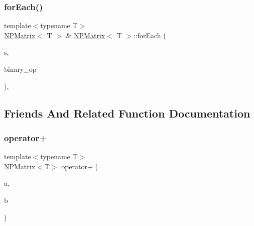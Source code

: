 \subsubsection{\texorpdfstring{forEach()}{forEach()}\hspace{0.1cm}{\footnotesize\ttfamily [2/2]}}
{\footnotesize\ttfamily template$<$typename T$>$ \\
\mbox{\hyperlink{class_n_p_matrix}{N\+P\+Matrix}}$<$ T $>$ \& \mbox{\hyperlink{class_n_p_matrix}{N\+P\+Matrix}}$<$ T $>$\+::for\+Each (\begin{DoxyParamCaption}\item[{T}]{s,  }\item[{const function$<$ void(T \&, T)$>$ \&}]{binary\+\_\+op }\end{DoxyParamCaption})\hspace{0.3cm}{\ttfamily [override]}, {\ttfamily [protected]}}



\subsection{Friends And Related Function Documentation}
\mbox{\label{class_n_p_matrix_aa3388754bcd5226d11ca97c258864300}} 
\subsubsection{\texorpdfstring{operator+}{operator+}}
{\footnotesize\ttfamily template$<$typename T$>$ \\
\mbox{\hyperlink{class_n_p_matrix}{N\+P\+Matrix}}$<$T$>$ operator+ (\begin{DoxyParamCaption}\item[{\mbox{\hyperlink{class_n_p_matrix}{N\+P\+Matrix}}$<$ T $>$}]{a,  }\item[{const \mbox{\hyperlink{class_n_p_matrix}{N\+P\+Matrix}}$<$ T $>$ \&}]{b }\end{DoxyParamCaption})\hspace{0.3cm}{\ttfamily [friend]}}

\mbox{\label{class_n_p_matrix_aeaf32670ee97547e19c84b9980f35914}} 
